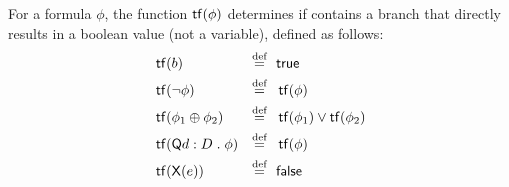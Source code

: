 \documentclass{article}
\begin{document}
For a formula $\phi$, the function $\operatorname*{\mathsf{tf}}(\phi)$
determines if contains a branch that directly results in a boolean value (not a variable), defined as follows:
\begin{align*}
& \operatorname*{\mathsf{tf}}(b)                                     & \mathrel{\displaystyle \mathop{=}^{\text{def}}}\ \  & \mathsf{true} \\
& \operatorname*{\mathsf{tf}}(\neg \phi)                             & \mathrel{\displaystyle \mathop{=}^{\text{def}}}\ \  & \operatorname*{\mathsf{tf}}(\phi) \\
& \operatorname*{\mathsf{tf}}(\phi_1 \oplus \phi_2)                  & \mathrel{\displaystyle \mathop{=}^{\text{def}}}\ \  & \operatorname*{\mathsf{tf}}(\phi_1) \lor \operatorname*{\mathsf{tf}}(\phi_2) \\
& \operatorname*{\mathsf{tf}}(\mathsf{Q} d : D \mathrel{.} \phi) & \mathrel{\displaystyle \mathop{=}^{\text{def}}}\ \  & \operatorname*{\mathsf{tf}}(\phi) \\
& \operatorname*{\mathsf{tf}}(\mathsf{X}(e))                        & \mathrel{\displaystyle \mathop{=}^{\text{def}}}\ \  &  \mathsf{false} 
\end{align*}
\end{document}
